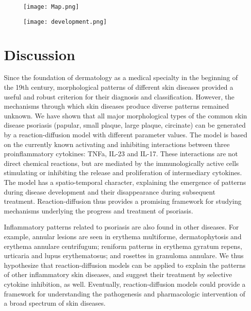 \begin{figure}[!ht]
	\centering
	\texttt{[image: Map.png]}
	\label{fig:pso3}
\end{figure}

\begin{figure}[!ht]
	\centering
	\texttt{[image: development.png]}
	\label{fig:pso4}
\end{figure}
	
\section{Discussion}

Since the foundation of dermatology as a medical specialty in the beginning of the 19th century, morphological patterns of different skin diseases provided a useful and robust criterion for their diagnosis and classification. However, the mechanisms through which skin diseases produce diverse patterns remained unknown. We have shown that all major morphological types of the common skin disease psoriasis (papular, small plaque, large plaque, circinate) can be generated by a reaction-diffusion model with different parameter values. The model is based on the currently known activating and inhibiting interactions between three proinflammatory cytokines: TNFa, IL-23 and IL-17. These interactions are not direct chemical reactions, but are mediated by the immunologically active cells stimulating or inhibiting the release and proliferation of intermediary cytokines. The model has a spatio-temporal character, explaining the emergence of patterns during disease development and their disappearance during subsequent treatment. Reaction-diffusion thus provides a promising framework for studying mechanisms underlying the progress and treatment of psoriasis. 

Inflammatory patterns related to psoriasis are also found in other diseases. For example, annular lesions are seen in erythema multiforme, dermatophytosis and erythema annulare centrifugum; reniform patterns in erythema gyratum repens, urticaria and lupus erythematosus; and rosettes in granuloma annulare. We thus hypothesize that reaction-diffusion models can be applied to explain the patterns of other inflammatory skin diseases, and suggest their treatment by selective cytokine inhibition, as well. Eventually, reaction-diffusion models could provide a framework for understanding the pathogenesis and pharmacologic intervention of a broad spectrum of skin diseases.